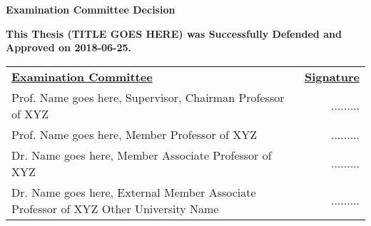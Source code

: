 \begin{center}
\textbf{\fontsize{16pt}{24pt}\selectfont Examination Committee Decision}
\end{center}
\textbf{\fontsize{14pt}{16pt}\selectfont This Thesis (TITLE GOES HERE) was Successfully Defended and Approved on 2018-06-25.}
\vspace{24pt}

\begin{table*}[!htbp]
\centering
\begin{tabularx}{\textwidth}{Xr}
\textbf{\underline{Examination Committee}} & \textbf{\underline{Signature}} \\[32pt]
Prof. Name goes here, Supervisor, Chairman \newline Professor of XYZ & ......... \\[32pt]
Prof. Name goes here, Member \newline Professor of XYZ & ......... \\[32pt]
Dr. Name goes here, Member \newline Associate Professor of XYZ & ......... \\[32pt]
Dr. Name goes here, External Member \newline Associate Professor of XYZ \newline Other University Name  & ......... \\[32pt]
\end{tabularx}
\end{table*}


